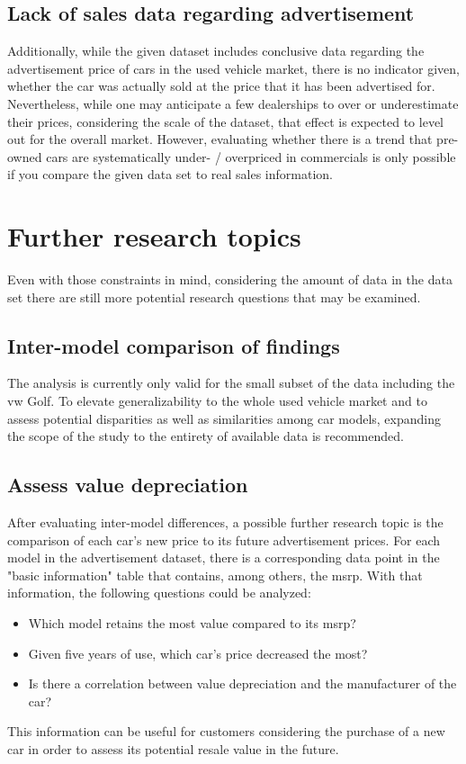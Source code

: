 \subsection{Lack of sales data regarding advertisement}
Additionally, while the given dataset includes conclusive data regarding the advertisement price of cars in the used vehicle market,
there is no indicator given, whether the car was actually sold at the price that it has been advertised for. 
\newline
Nevertheless, while one may anticipate a few dealerships to over or underestimate their prices,
considering the scale of the dataset, that effect is expected to level out for the overall market.
However, evaluating whether there is a trend that pre-owned cars are systematically under- / overpriced in commercials
is only possible if you compare the given data set to real sales information.

\section{Further research topics}
Even with those constraints in mind, considering the amount of data in the data set there are still more potential research questions that may be examined. 

\subsection{Inter-model comparison of findings}
The analysis is currently only valid for the small subset of the data including the \ac{vw} Golf. 
To elevate generalizability to the whole used vehicle market and to assess potential disparities as well as similarities among
car models, expanding the scope of the study to the entirety of available data is recommended.  
\subsection{Assess value depreciation}
After evaluating inter-model differences, a possible further research topic is the comparison of each car's new price
to its future advertisement prices. For each model in the advertisement dataset, there is a corresponding data point
in the "basic information" table that contains, among others, the \ac{msrp}. 
\newline
With that information, the following questions could be analyzed: 
\begin{itemize}
\item Which model retains the most value compared to its \ac{msrp}?
\item Given five years of use, which car's price decreased the most?
\item Is there a correlation between value depreciation and the manufacturer of the car?
\end{itemize}
This information can be useful for customers considering the purchase of a new car in order to assess its potential resale value in the future.

